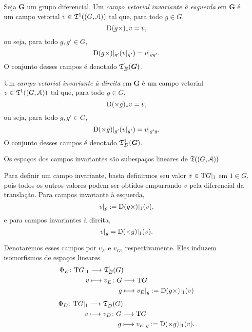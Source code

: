 \begin{definition}
Seja $\bm G$ um grupo diferencial. Um \emph{campo vetorial invariante à esquerda} em $\bm G$ é um campo vetorial $v \in \mathfrak{T}^1((G,\mathcal{A}))$ tal que, para todo $g \in G$,
	\begin{equation*}
	\mathrm{D}(g \times)_\star v = v,
	\end{equation*}
ou seja, para todo $g,g' \in G$,
	\begin{equation*}
	\mathrm{D}(g \times)|_{g'} (v|_{g'}) = v|_{gg'}.
	\end{equation*}
O conjunto desses campos é denotado $\mathfrak{T}^1_E(\bm G)$.

Um \emph{campo vetorial invariante à direita} em $\bm G$ é um campo vetorial $v \in \mathfrak{T}^1((G,\mathcal{A}))$ tal que, para todo $g \in G$,
	\begin{equation*}
	\mathrm{D}(\times g)_\star v = v,
	\end{equation*}
ou seja, para todo $g,g' \in G$,
	\begin{equation*}
	\mathrm{D}(\times g)|_{g'} (v|_{g'}) = v|_{g'g}.
	\end{equation*}
O conjunto desses campos é denotado $\mathfrak{T}^1_D(\bm G)$.
\end{definition}


Os espaços dos campos invariantes são subespaços lineares de $\mathfrak{T}((G,\mathcal{A}))$

Para definir um campo invariante, basta definirmos seu valor $v \in \mathrm{T} G|_1$ em $1 \in G$, pois todos os outros valores podem ser obtidos empurrando $v$ pela diferencial da translação. Para campos invariante à esquerda,
	\begin{equation*}
	v|_p := \mathrm{D}(g \times)|_{1} (v),
	\end{equation*}
e para campos invariantes à direita,
	\begin{equation*}
	v|_{g} = \mathrm{D}(\times g)|_{1} (v).
	\end{equation*}

Denotaremos esses campos por $v_E$ e $v_D$, respectivamente. Eles induzem isomorfismos de espaços lineares
	\begin{align*}
	\func{\Phi_E}{\Tg G|_1}{\tens^1_E(G)}{v}{
		\begin{aligned}[t]
		\func{v_E}{G}{\Tg G}{g}{v_E|_g := \D(g \times)|_{1} (v)}
		\end{aligned}
	}
	\end{align*}
	\begin{align*}
	\func{\Phi_D}{\Tg G|_1}{\tens^1_D(G)}{v}{
		\begin{aligned}[t]
		\func{v_D}{G}{\Tg G}{g}{v_E|_g := \D(\times g)|_{1} (v)}.
		\end{aligned}
	}
	\end{align*}

